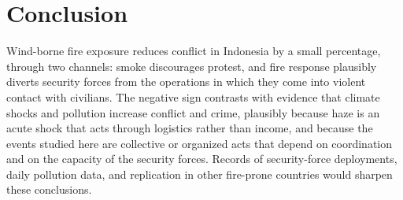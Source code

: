 \documentclass[12pt]{article}
\begin{document}
\section{Conclusion}

Wind-borne fire exposure reduces conflict in Indonesia by a small percentage, through two channels: smoke discourages protest, and fire response plausibly diverts security forces from the operations in which they come into violent contact with civilians. The negative sign contrasts with evidence that climate shocks and pollution increase conflict and crime, plausibly because haze is an acute shock that acts through logistics rather than income, and because the events studied here are collective or organized acts that depend on coordination and on the capacity of the security forces. Records of security-force deployments, daily pollution data, and replication in other fire-prone countries would sharpen these conclusions.



\end{document}
